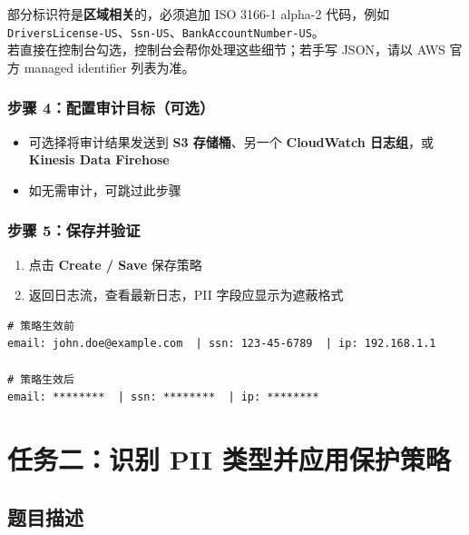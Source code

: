 \documentclass[12pt, a4paper]{article}
\begin{document}
\begin{warnbox}
  部分标识符是\textbf{区域相关}的，必须追加 ISO 3166-1 alpha-2 代码，例如
  \texttt{DriversLicense-US}、\texttt{Ssn-US}、\texttt{BankAccountNumber-US}。\\
  若直接在控制台勾选，控制台会帮你处理这些细节；若手写 JSON，请以 AWS 官方 managed identifier 列表为准。
\end{warnbox}

\subsubsection{步骤 4：配置审计目标（可选）}

\begin{itemize}[leftmargin=2em]
  \item 可选择将审计结果发送到 \textbf{S3 存储桶}、另一个 \textbf{CloudWatch 日志组}，或 \textbf{Kinesis Data Firehose}
  \item 如无需审计，可跳过此步骤
\end{itemize}

\subsubsection{步骤 5：保存并验证}

\begin{enumerate}[leftmargin=2em]
  \item 点击 \textbf{Create / Save} 保存策略
  \item 返回日志流，查看最新日志，PII 字段应显示为遮蔽格式
\end{enumerate}

\begin{lstlisting}[caption={策略生效后的日志示例}]
# 策略生效前
email: john.doe@example.com  | ssn: 123-45-6789  | ip: 192.168.1.1

# 策略生效后
email: ********  | ssn: ********  | ip: ********
\end{lstlisting}

\newpage

\section{任务二：识别 PII 类型并应用保护策略}

\subsection{题目描述}
\end{document}
